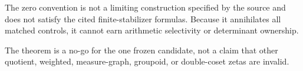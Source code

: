 \begin{remark}
The zero convention is not a limiting construction specified by the source
and does not satisfy the cited finite-stabilizer formulas.  Because it
annihilates all matched controls, it cannot earn arithmetic selectivity or
determinant ownership.
\end{remark}

The theorem is a no-go for the one frozen candidate, not a claim that other
quotient, weighted, measure-graph, groupoid, or double-coset zetas are
invalid.
